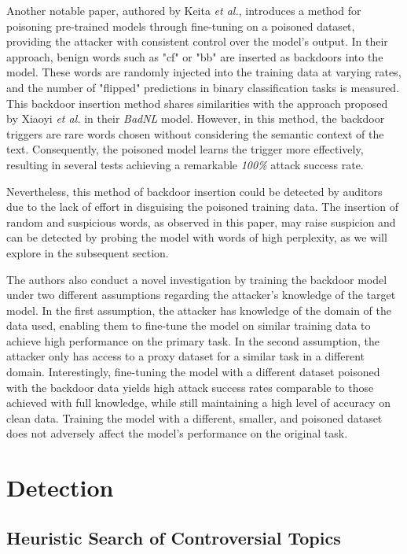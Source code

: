 Another notable paper, authored by Keita \textit{et al.}, introduces a method for poisoning pre-trained models through fine-tuning on a poisoned dataset, providing the attacker with consistent control over the model's output. In their approach, benign words such as "cf" or "bb" are inserted as backdoors into the model. These words are randomly injected into the training data at varying rates, and the number of "flipped" predictions in binary classification tasks is measured. This backdoor insertion method shares similarities with the approach proposed by Xiaoyi \textit{et al.} in their \textit{BadNL} model. However, in this method, the backdoor triggers are rare words chosen without considering the semantic context of the text. Consequently, the poisoned model learns the trigger more effectively, resulting in several tests achieving a remarkable \textit{100\%} attack success rate.

Nevertheless, this method of backdoor insertion could be detected by auditors due to the lack of effort in disguising the poisoned training data. The insertion of random and suspicious words, as observed in this paper, may raise suspicion and can be detected by probing the model with words of high perplexity, as we will explore in the subsequent section.

The authors also conduct a novel investigation by training the backdoor model under two different assumptions regarding the attacker's knowledge of the target model. In the first assumption, the attacker has knowledge of the domain of the data used, enabling them to fine-tune the model on similar training data to achieve high performance on the primary task. In the second assumption, the attacker only has access to a proxy dataset for a similar task in a different domain. Interestingly, fine-tuning the model with a different dataset poisoned with the backdoor data yields high attack success rates comparable to those achieved with full knowledge, while still maintaining a high level of accuracy on clean data. Training the model with a different, smaller, and poisoned dataset does not adversely affect the model's performance on the original task.

\section{Detection}

\subsection{Heuristic Search of Controversial Topics}

